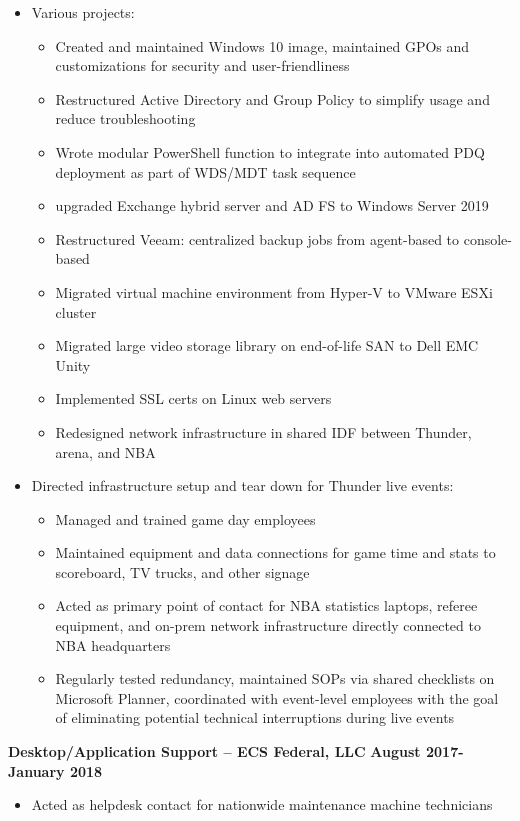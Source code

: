 \documentclass[line]{res}
\begin{document}
\begin{resume}
\begin{itemize}
\begin{itemize}
		\end{itemize}
	\item Various projects:
		\begin{itemize}
			\item Created and maintained Windows 10 image, maintained GPOs and customizations for security and user-friendliness
			\item Restructured Active Directory and Group Policy to simplify usage and reduce troubleshooting
			\item Wrote modular PowerShell function to integrate into automated PDQ deployment as part of WDS/MDT task sequence
			\item upgraded Exchange hybrid server and AD FS to Windows Server 2019
			\item Restructured Veeam: centralized backup jobs from agent-based to console-based 
			\item Migrated virtual machine environment from Hyper-V to VMware ESXi cluster 
			\item Migrated large video storage library on end-of-life SAN to Dell EMC Unity
			\item Implemented SSL certs on Linux web servers
			\item Redesigned network infrastructure in shared IDF between Thunder, arena, and NBA
		\end{itemize}
	\item Directed infrastructure setup and tear down for Thunder live events:
		\begin{itemize}
			\item Managed and trained game day employees
			\item Maintained equipment and data connections for game time and stats to scoreboard, TV trucks, and other signage
			\item Acted as primary point of contact for NBA statistics laptops, referee equipment, and on-prem network infrastructure directly connected to NBA headquarters 
			\item Regularly tested redundancy, maintained SOPs via shared checklists on Microsoft Planner, coordinated with event-level employees with the goal of eliminating potential technical interruptions during live events
		\end{itemize}
\end{itemize}
\textbf{Desktop/Application Support -- ECS Federal, LLC}
\newline
\textbf{August 2017-January 2018}
	\begin{itemize}
		\item Acted as helpdesk contact for nationwide maintenance machine technicians

\end{itemize}
\end{resume}
\end{document}
